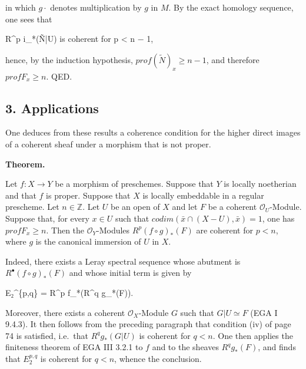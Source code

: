 \documentclass[
]{article}
\newenvironment{Shaded}{}{}
\newcommand{\NormalTok}[1]{#1}
\begin{document}
in which \(g\cdot\) denotes multiplication by \(g\) in \(M\). By the
exact homology sequence, one sees that

\begin{Shaded}
\begin{Highlighting}[]
\NormalTok{R\^{}p i\_*(Ñ|U)    is coherent for p \textless{} n − 1,}
\end{Highlighting}
\end{Shaded}

hence, by the induction hypothesis,
\(prof(\tilde{N})_{x} \geqslant n - 1\), and therefore
\(prof F_{x} \geqslant n\). QED.

\subsection{3. Applications}\label{applications}

One deduces from these results a coherence condition for the higher
direct images of a coherent sheaf under a morphism that is not proper.

\textbf{Theorem.}

Let \(f : X \to Y\) be a morphism of preschemes. Suppose that \(Y\) is
locally noetherian and that \(f\) is proper. Suppose that \(X\) is
locally embeddable in a regular prescheme. Let \(n \in \mathbb{Z}\). Let
\(U\) be an open of \(X\) and let \(F\) be a coherent
\(\mathcal{O}_{U}\)-Module. Suppose that, for every \(x \in U\) such
that \(codim(\bar{x} \cap (X - U), \bar{x}) = 1\), one has
\(prof F_{x} \geqslant n\). Then the \(\mathcal{O}_{Y}\)-Modules
\(R^{p}(f \circ g)_{*}(F)\) are coherent for \(p < n\), where \(g\) is
the canonical immersion of \(U\) in \(X\).

Indeed, there exists a Leray spectral sequence whose abutment is
\(R^{\bullet}(f \circ g)_{*}(F)\) and whose initial term is given by

\begin{Shaded}
\begin{Highlighting}[]
\NormalTok{E₂\^{}\{p,q\} = R\^{}p f\_*(R\^{}q g\_*(F)).}
\end{Highlighting}
\end{Shaded}

Moreover, there exists a coherent \(\mathcal{O}_{X}\)-Module \(G\) such
that \(G|U \simeq F\) (EGA I 9.4.3). It then follows from the preceding
paragraph that condition (iv) of page 74 is satisfied, i.e.~that
\(R^{q} g_{*}(G|U)\) is coherent for \(q < n\). One then applies the
finiteness theorem of EGA III 3.2.1 to \(f\) and to the sheaves
\(R^{q} g_{*}(F)\), and finds that \(E^{p,q}_{2}\) is coherent for
\(q < n\), whence the conclusion.
\end{document}

